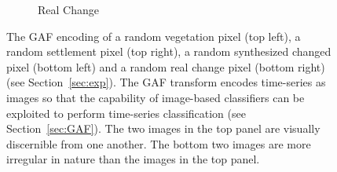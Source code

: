 \documentclass{article}
\begin{document}
\begin{figure}[h]
\begin{subfigure}[b]{0.5\linewidth}
    \caption{Real Change} 
    \label{fig7:d} 
  \end{subfigure} 
  \label{fig:gaf}
  \caption{The GAF encoding of a random vegetation pixel (top left), a random settlement pixel (top right), a random synthesized changed pixel (bottom left) and a random real change pixel (bottom right) (see Section~\ref{sec:exp}). The GAF transform encodes time-series as images so that the capability of image-based classifiers can be exploited to perform time-series classification (see Section~\ref{sec:GAF}).  The two images in the top panel are visually discernible from one another. The bottom two images are more irregular in nature than the images in the top panel.}
  \label{fig:gaf}
\end{figure}











\end{document}
